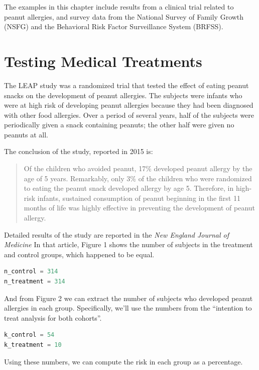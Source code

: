 The examples in this chapter include results from a clinical trial
related to peanut allergies, and survey data from the National Survey of
Family Growth (NSFG) and the Behavioral Risk Factor Surveillance System
(BRFSS).

\hypertarget{testing-medical-treatments}{%
\section{Testing Medical Treatments}\label{testing-medical-treatments}}

The LEAP study was a randomized trial that tested the effect of eating
peanut snacks on the development of peanut allergies. The subjects were
infants who were at high risk of developing peanut allergies because
they had been diagnosed with other food allergies. Over a period of
several years, half of the subjects were periodically given a snack
containing peanuts; the other half were given no peanuts at all.

The conclusion of the study, reported in 2015 is:

\begin{quote}
Of the children who avoided peanut, 17\% developed peanut allergy by the
age of 5 years. Remarkably, only 3\% of the children who were randomized
to eating the peanut snack developed allergy by age 5. Therefore, in
high-risk infants, sustained consumption of peanut beginning in the
first 11 months of life was highly effective in preventing the
development of peanut allergy.
\end{quote}

Detailed results of the study are reported in the \emph{New England
Journal of Medicine} In that article, Figure 1 shows the number of
subjects in the treatment and control groups, which happened to be
equal.

\begin{lstlisting}[language=Python,style=source]
n_control = 314
n_treatment = 314
\end{lstlisting}

And from Figure 2 we can extract the number of subjects who developed
peanut allergies in each group. Specifically, we'll use the numbers from
the ``intention to treat analysis for both cohorts''.

\begin{lstlisting}[language=Python,style=source]
k_control = 54
k_treatment = 10
\end{lstlisting}

Using these numbers, we can compute the risk in each group as a
percentage.

